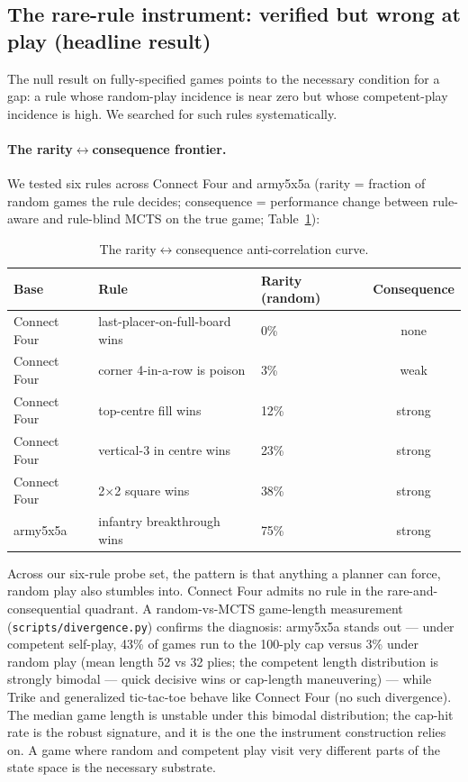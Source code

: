 \documentclass[11pt]{article}
\theoremstyle{remark}
\begin{document}
\subsection{The rare-rule instrument: verified but wrong at play (headline result)}
\label{sec:rare-rule}

The null result on fully-specified games points to the necessary condition for a gap: a rule whose random-play incidence is near zero but whose competent-play incidence is high. We searched for such rules systematically.

\paragraph{The rarity$\leftrightarrow$consequence frontier.} We tested six rules across Connect Four and army5x5a (rarity = fraction of random games the rule decides; consequence = performance change between rule-aware and rule-blind MCTS on the true game; Table~\ref{tab:frontier}):

\begin{table}[ht]
\centering
\small
\begin{tabular}{lllc}
\toprule
Base & Rule & Rarity (random) & Consequence \\
\midrule
Connect Four & last-placer-on-full-board wins & 0\%  & none \\
Connect Four & corner 4-in-a-row is poison    & 3\%  & weak \\
Connect Four & top-centre fill wins           & 12\% & strong \\
Connect Four & vertical-3 in centre wins      & 23\% & strong \\
Connect Four & 2$\times$2 square wins         & 38\% & strong \\
army5x5a     & infantry breakthrough wins     & 75\% & strong \\
\bottomrule
\end{tabular}
\caption{The rarity$\leftrightarrow$consequence anti-correlation curve.}
\label{tab:frontier}
\end{table}

Across our six-rule probe set, the pattern is that anything a planner can force, random play also stumbles into. Connect Four admits no rule in the rare-and-consequential quadrant. A random-vs-MCTS game-length measurement (\texttt{scripts/divergence.py}) confirms the diagnosis: army5x5a stands out --- under competent self-play, 43\% of games run to the 100-ply cap versus 3\% under random play (mean length 52 vs 32 plies; the competent length distribution is strongly bimodal --- quick decisive wins or cap-length maneuvering) --- while Trike and generalized tic-tac-toe behave like Connect Four (no such divergence). The median game length is unstable under this bimodal distribution; the cap-hit rate is the robust signature, and it is the one the instrument construction relies on. A game where random and competent play visit very different parts of the state space is the necessary substrate.
\end{document}
